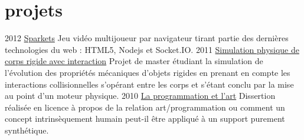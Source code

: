 \documentclass[]{friggeri-cv}
\begin{document}
\section{projets}

\begin{entrylist}
  \entry
    {2012}
    {\href{http://github.com/fmdkdd/sparkets}{Sparkets}}
    {}
    {Jeu vidéo multijoueur par navigateur tirant partie des dernières
      technologies du web : HTML5, Nodejs et Socket.IO.}
  \entry
    {2011}
    {\href{http://github.com/merwaaan/physics}{Simulation physique de corps rigide avec interaction}}
    {}
    {Projet de master étudiant la simulation de l'évolution des
      propriétés mécaniques d'objets rigides en prenant en compte les
      interactions collisionnelles s'opérant entre les corps et
      s'étant conclu par la mise au point d'un moteur physique.}
  \entry
    {2010}
    {\href{http://github.com/merwaaan/papers/blob/master/art/progart.pdf?raw=true}{La programmation et l'art}}
    {}
    {Dissertion réalisée en licence à propos de la relation
      art/programmation ou comment un concept intrinsèquement humain
      peut-il être appliqué à un support purement synthétique.}

\end{entrylist}
\end{document}
